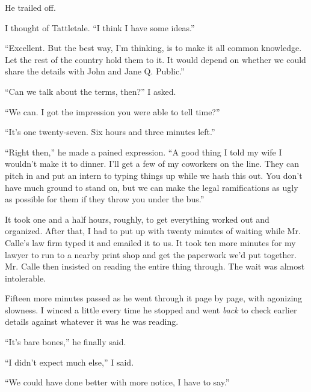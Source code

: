 He trailed off.



I thought of Tattletale.  ``I think I have some ideas.''



``Excellent.  But the best way, I'm thinking, is to make it all common knowledge.  Let the rest of the country hold them to it.  It would depend on whether we could share the details with John and Jane Q. Public.''



``Can we talk about the terms, then?'' I asked.



``We can.  I got the impression you were able to tell time?''



``It's one twenty-seven.  Six hours and three minutes left.''



``Right then,'' he made a pained expression.  ``A good thing I told my wife I wouldn't make it to dinner.  I'll get a few of my coworkers on the line.  They can pitch in and put an intern to typing things up while we hash this out.  You don't have much ground to stand on, but we can make the legal ramifications as ugly as possible for them if they throw you under the bus.''



\sectionbreak



It took one and a half hours, roughly, to get everything worked out and organized.  After that, I had to put up with twenty minutes of waiting while Mr. Calle's law firm typed it and emailed it to us.  It took ten more minutes for my lawyer to run to a nearby print shop and get the paperwork we'd put together.  Mr. Calle then insisted on reading the entire thing through.  The wait was almost intolerable.



Fifteen more minutes passed as he went through it page by page, with agonizing slowness.  I winced a little every time he stopped and went \emph{back} to check earlier details against whatever it was he was reading.



``It's bare bones,'' he finally said.



``I didn't expect much else,'' I said.



``We could have done better with more notice, I have to say.''



